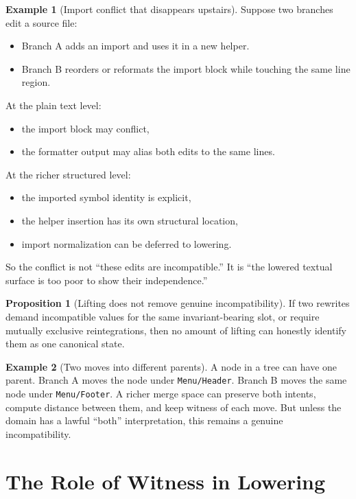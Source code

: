\documentclass[11pt]{article}
\theoremstyle{definition}
\newtheorem{proposition}{Proposition}
\newtheorem{example}{Example}
\begin{document}
\begin{example}[Import conflict that disappears upstairs]
Suppose two branches edit a source file:
\begin{itemize}[leftmargin=2em]
\item Branch A adds an import and uses it in a new helper.
\item Branch B reorders or reformats the import block while touching the same
  line region.
\end{itemize}

At the plain text level:
\begin{itemize}[leftmargin=2em]
\item the import block may conflict,
\item the formatter output may alias both edits to the same lines.
\end{itemize}

At the richer structured level:
\begin{itemize}[leftmargin=2em]
\item the imported symbol identity is explicit,
\item the helper insertion has its own structural location,
\item import normalization can be deferred to lowering.
\end{itemize}

So the conflict is not ``these edits are incompatible.'' It is
``the lowered textual surface is too poor to show their independence.''
\end{example}

\begin{proposition}[Lifting does not remove genuine incompatibility]
If two rewrites demand incompatible values for the same invariant-bearing slot,
or require mutually exclusive reintegrations, then no amount of lifting can
honestly identify them as one canonical state.
\end{proposition}

\begin{example}[Two moves into different parents]
A node in a tree can have one parent. Branch A moves the node under
\texttt{Menu/Header}. Branch B moves the same node under
\texttt{Menu/Footer}. A richer merge space can preserve both intents, compute
distance between them, and keep witness of each move. But unless the domain has
a lawful ``both'' interpretation, this remains a genuine incompatibility.
\end{example}

\section{The Role of Witness in Lowering}
\end{document}
